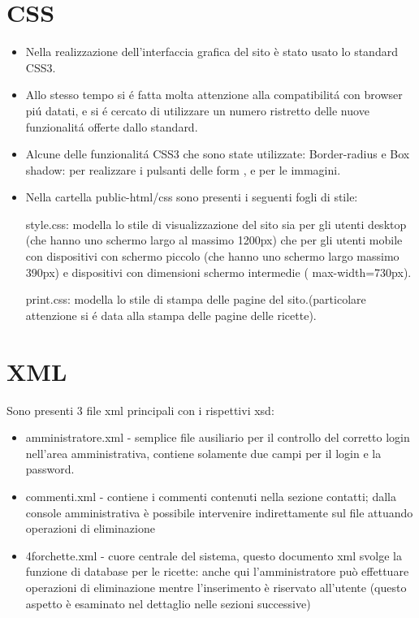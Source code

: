 \documentclass[12pt]{article}
\begin{document}
		\newpage	
	\section{CSS}
			\begin{itemize}
				\item Nella realizzazione dell'interfaccia grafica del sito è stato usato lo standard CSS3.
				\item Allo stesso tempo si \'e fatta molta attenzione alla compatibilit\'a con browser pi\'u datati, e si \'e cercato di utilizzare un numero ristretto delle nuove funzionalit\'a offerte dallo standard.
				
				\item Alcune delle funzionalit\'a CSS3 che sono state utilizzate:
				Border-radius e Box shadow: per realizzare i pulsanti delle form , e per le immagini.
				
			
				\item Nella cartella public-html/css sono presenti i seguenti fogli di stile:

				\subitem style.css: modella lo stile di visualizzazione del sito sia per gli utenti desktop (che hanno uno schermo largo al massimo 1200px) che per gli utenti mobile con dispositivi con schermo piccolo (che hanno uno schermo largo massimo 390px) e dispositivi con dimensioni schermo intermedie ( max-width=730px).


				\subitem print.css: modella lo stile di stampa delle pagine del sito.(particolare attenzione si \'e data alla stampa delle pagine delle ricette).

\end{itemize}
					\newpage
				
		\section{XML}
		Sono presenti 3 file xml principali con i rispettivi xsd:

		\begin{itemize}
		\item  amministratore.xml - semplice file ausiliario per il controllo del corretto login nell'area amministrativa, contiene solamente due campi per il login e la password.
		
		\item commenti.xml - contiene i commenti contenuti nella sezione contatti; dalla console amministrativa è possibile intervenire indirettamente sul file attuando operazioni di eliminazione
		
		\item 4forchette.xml - cuore centrale del sistema, questo documento xml svolge la funzione di database per le ricette: anche qui l'amministratore può effettuare operazioni di eliminazione mentre l'inserimento è riservato all'utente (questo aspetto \`e esaminato nel dettaglio nelle sezioni successive)
		\end{itemize}				
					
\end{document}
